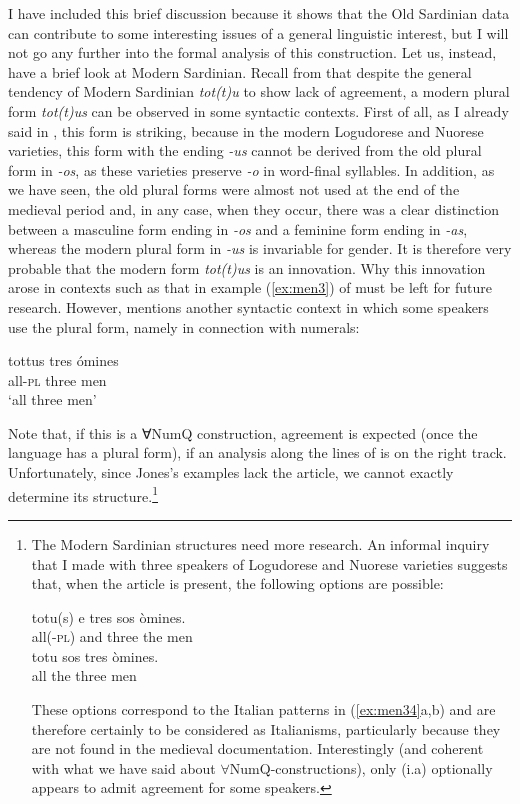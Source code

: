 \documentclass[output=paper,colorlinks,citecolor=brown]{langscibook}
\begin{document}
I have included this brief discussion because it shows that the Old Sardinian data can contribute to some interesting issues of a general linguistic interest, but I will not go any further into the formal analysis of this construction. Let us, instead, have a brief look at Modern Sardinian. Recall from  that despite the general tendency of Modern Sardinian \textit{tot(t)u} to show lack of agreement, a modern plural form \textit{tot(t)us} can be observed in some syntactic contexts. First of all, as I already said in , this form is striking, because in the modern Logudorese and Nuorese varieties, this form with the ending \textit{-us} cannot be derived from the old plural form in \textit{-os}, as these varieties preserve \textit{-o} in word-final syllables. In addition, as we have seen, the old plural forms were almost not used at the end of the medieval period and, in any case, when they occur, there was a clear distinction between a masculine form ending in \textit{-os} and a feminine form ending in \textit{-as}, whereas the modern plural form in \textit{-us} is invariable for gender. It is therefore very probable that the modern form \textit{tot(t)us} is an innovation. Why this innovation arose in contexts such as that in example (\ref{ex:men3}) of  must be left for future research. However, \citet[][38]{Jones1993} mentions another syntactic context in which some speakers use the plural form, namely in connection with numerals:\largerpage

\ea\label{ex:men41}
\gll tottus tres ómines\\
all-\textsc{pl} three men\\
\glt ‘all three men’
\z

Note that, if this is a ∀NumQ construction, agreement is expected (once the language has a plural form), if an analysis along the lines of \citet{Corver2010} is on the right track. Unfortunately, since Jones’s examples lack the article, we cannot exactly determine its structure.\footnote{The Modern Sardinian structures need more research. An informal inquiry that I made with three speakers of Logudorese and Nuorese varieties suggests that, when the article is present, the following options are possible:

\ea\label{ex:menfootnote50}
\ea \gll totu(s)	e	tres 	sos	òmines.\\
all(-\textsc{pl})	and	three	the	men \\
\ex \gll totu	sos	tres òmines.\\
 all	the	three men \\
\z
\z

These options correspond to the Italian patterns in (\ref{ex:men34}a,b) and are therefore certainly to be considered as Italianisms, particularly because they are not found in the medieval documentation. Interestingly (and coherent with what we have said about $\forall$NumQ-constructions), only (i.a) optionally appears to admit agreement for some speakers.}
\end{document}
